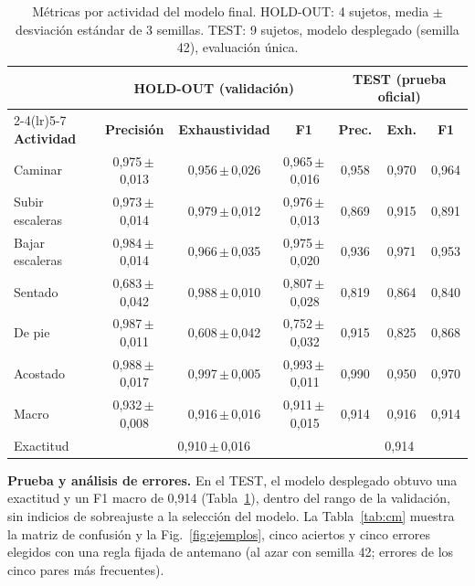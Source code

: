 \documentclass[runningheads]{llncs}
\newcommand{\pmv}[2]{#1\,{\scriptsize$\pm$\,#2}}   %
\begin{document}
\begin{table}[t]
\centering
\caption{Métricas por actividad del modelo final. HOLD-OUT: 4 sujetos, media
$\pm$ desviación estándar de 3 semillas. TEST: 9 sujetos, modelo desplegado
(semilla 42), evaluación única.}\label{tab:clases}
\scriptsize
\setlength{\tabcolsep}{4pt}
\begin{tabular}{lccc@{\hspace{10pt}}ccc}
\toprule
 & \multicolumn{3}{c}{HOLD-OUT (validación)} & \multicolumn{3}{c}{TEST (prueba oficial)}\\
\cmidrule(lr){2-4}\cmidrule(lr){5-7}
\textbf{Actividad} & \textbf{Precisión} & \textbf{Exhaustividad} & \textbf{F1} & \textbf{Prec.} & \textbf{Exh.} & \textbf{F1}\\
\midrule
Caminar         & \pmv{0,975}{0,013} & \pmv{0,956}{0,026} & \pmv{0,965}{0,016} & 0,958 & 0,970 & 0,964\\
Subir escaleras & \pmv{0,973}{0,014} & \pmv{0,979}{0,012} & \pmv{0,976}{0,013} & 0,869 & 0,915 & 0,891\\
Bajar escaleras & \pmv{0,984}{0,014} & \pmv{0,966}{0,035} & \pmv{0,975}{0,020} & 0,936 & 0,971 & 0,953\\
Sentado         & \pmv{0,683}{0,042} & \pmv{0,988}{0,010} & \pmv{0,807}{0,028} & 0,819 & 0,864 & 0,840\\
De pie          & \pmv{0,987}{0,011} & \pmv{0,608}{0,042} & \pmv{0,752}{0,032} & 0,915 & 0,825 & 0,868\\
Acostado        & \pmv{0,988}{0,017} & \pmv{0,997}{0,005} & \pmv{0,993}{0,011} & 0,990 & 0,950 & 0,970\\
\midrule
Macro           & \pmv{0,932}{0,008} & \pmv{0,916}{0,016} & \pmv{0,911}{0,015} & 0,914 & 0,916 & 0,914\\
Exactitud       & \multicolumn{3}{c}{\pmv{0,910}{0,016}} & \multicolumn{3}{c}{0,914}\\
\bottomrule
\end{tabular}
\end{table}

\textbf{Prueba y análisis de errores.} En el TEST, el modelo desplegado obtuvo una
exactitud y un F1 macro de 0,914 (Tabla~\ref{tab:clases}), %
dentro del rango de la validación, sin indicios de sobreajuste a la selección
del modelo. La Tabla~\ref{tab:cm} muestra la matriz de confusión y la
Fig.~\ref{fig:ejemplos}, cinco aciertos y cinco errores elegidos con una regla
fijada de antemano (al azar con semilla 42; errores de los cinco pares más
frecuentes).
\end{document}
